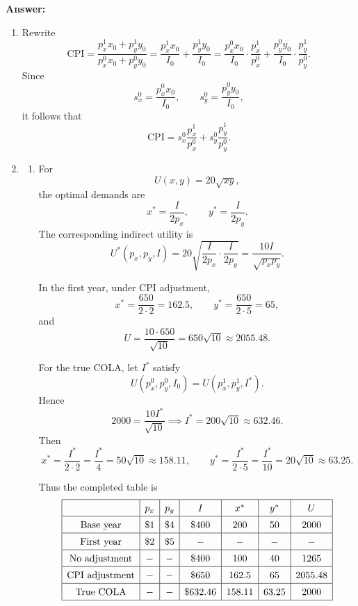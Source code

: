 \documentclass[12pt,a4paper]{article}
\begin{document}
\vspace{0.5cm}

\noindent\textbf{Answer: }

\begin{enumerate}[label=(\alph*)]
  \item Rewrite
  \[
    \mathrm{CPI}
    =\frac{p_x^1x_0+p_y^1y_0}{p_x^0x_0+p_y^0y_0}
    =\frac{p_x^1x_0}{I_0}+\frac{p_y^1y_0}{I_0}
    =
    \frac{p_x^0x_0}{I_0}\cdot \frac{p_x^1}{p_x^0}
    +
    \frac{p_y^0y_0}{I_0}\cdot \frac{p_y^1}{p_y^0}.
  \]
  Since
  \[
    s_x^0=\frac{p_x^0x_0}{I_0},
    \qquad
    s_y^0=\frac{p_y^0y_0}{I_0},
  \]
  it follows that
  \[
    \mathrm{CPI}
    =s_x^0\frac{p_x^1}{p_x^0}+s_y^0\frac{p_y^1}{p_y^0}.
  \]

  \item 
  \begin{enumerate}[label=(b.\arabic*)]
    \item For
    \[
      U(x,y)=20\sqrt{xy},
    \]
    the optimal demands are
    \[
      x^*=\frac{I}{2p_x},
      \qquad
      y^*=\frac{I}{2p_y}.
    \]
    The corresponding indirect utility is
    \[
      U^*(p_x,p_y,I)
      =20\sqrt{\frac{I}{2p_x}\cdot \frac{I}{2p_y}}
      =\frac{10I}{\sqrt{p_xp_y}}.
    \]
  
    In the first year, under CPI adjustment,
    \[
      x^*=\frac{650}{2\cdot 2}=162.5,
      \qquad
      y^*=\frac{650}{2\cdot 5}=65,
    \]
    and
    \[
      U=\frac{10\cdot 650}{\sqrt{10}}
      =650\sqrt{10}
      \approx 2055.48.
    \]
  
    For the true COLA, let \(I^*\) satisfy
    \[
      U(p_x^0,p_y^0,I_0)=U(p_x^1,p_y^1,I^*).
    \]
    Hence
    \[
      2000=\frac{10I^*}{\sqrt{10}}\implies I^*=200\sqrt{10}\approx 632.46.
    \]
    Then
    \[
      x^*=\frac{I^*}{2\cdot 2}=\frac{I^*}{4}=50\sqrt{10}\approx 158.11,
      \qquad
      y^*=\frac{I^*}{2\cdot 5}=\frac{I^*}{10}=20\sqrt{10}\approx 63.25.
    \]
  
    Thus the completed table is
    \[
    \renewcommand{\arraystretch}{1.4}
    \begin{array}{|c|c|c|c|c|c|c|}
    \hline
    & p_x & p_y & I & x^* & y^* & U \\
    \hline
    \text{Base year} & \$1 & \$4 & \$400 & 200 & 50 & 2000 \\
    \hline
    \text{First year} & \$2 & \$5 & - & - & - & - \\
    \hline
    \text{No adjustment} & - & - & \$400 & 100 & 40 & 1265 \\
    \hline
    \text{CPI adjustment} & - & - & \$650 & 162.5 & 65 & 2055.48 \\
    \hline
    \text{True COLA} & - & - & \$632.46 & 158.11 & 63.25 & 2000 \\
    \hline
    \end{array}
    \]
  

\end{enumerate}
\end{enumerate}
\end{document}
